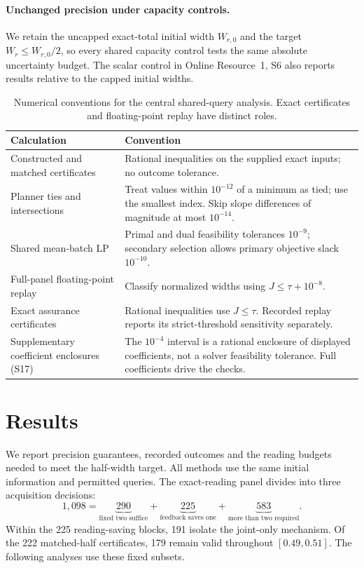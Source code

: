 \documentclass[12pt]{article}
\begin{document}
\paragraph{Unchanged precision under capacity controls.}
We retain the uncapped exact-total initial width $W_{r,0}$ and the target
$W_r\leq W_{r,0}/2$, so every shared capacity control tests the same
absolute uncertainty budget. The scalar control in Online Resource~1, S6
also reports results relative to the capped initial widths.
\begin{table}[htbp]\centering\small
\caption{Numerical conventions for the central shared-query analysis.
Exact certificates and floating-point replay have distinct roles.}
\label{tab:numerical-conventions}
\begin{tabular}{@{}>{\raggedright\arraybackslash}p{.27\linewidth}>{\raggedright\arraybackslash}p{.66\linewidth}@{}}
\toprule
Calculation & Convention\\\midrule
Constructed and matched certificates &
Rational inequalities on the supplied exact inputs; no outcome tolerance.\\
Planner ties and intersections &
Treat values within $10^{-12}$ of a minimum as tied; use the smallest index.
Skip slope differences of magnitude at most $10^{-14}$.\\
Shared mean-batch LP &
Primal and dual feasibility tolerances $10^{-9}$; secondary selection
allows primary objective slack $10^{-10}$.\\
Full-panel floating-point replay &
Classify normalized widths using $J\leq\tau+10^{-8}$.\\
Exact assurance certificates &
Rational inequalities use $J\leq\tau$. Recorded replay reports its
strict-threshold sensitivity separately.\\
Supplementary coefficient enclosures (S17) &
The $10^{-4}$ interval is a rational enclosure of displayed coefficients,
not a solver feasibility tolerance. Full coefficients drive the checks.\\
\bottomrule\end{tabular}\end{table}
\section{Results}\label{sec:evaluation}
We report precision guarantees, recorded outcomes and the reading budgets
needed to meet the half-width target. All methods use the same initial
information and permitted queries.
The exact-reading panel divides into three acquisition decisions:
\[
1{,}098=
\underbrace{290}_{\text{fixed two suffice}}+
\underbrace{225}_{\text{feedback saves one}}+
\underbrace{583}_{\text{more than two required}}.
\]
Within the 225 reading-saving blocks, 191 isolate the joint-only mechanism.
Of the 222 matched-half certificates, 179 remain valid throughout
$[0.49,0.51]$. The following analyses use these fixed subsets.
\end{document}
